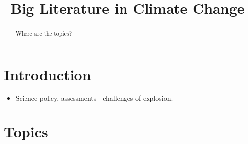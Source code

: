 \documentclass{article}
\title{Big Literature in Climate Change}
\begin{document}
\maketitle
\begin{abstract}
Where are the topics?
\end{abstract}

\section{Introduction}
\begin{itemize}	

	\item Science policy, assessments - challenges of explosion.
    
	
\end{itemize}

\section{Topics}
\end{document}
